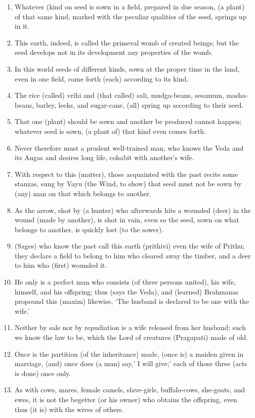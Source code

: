 \begin{enumerate}
\item Whatever (kind on seed is sown in a field, prepared in due season, (a plant) of that same kind, marked with the peculiar qualities of the seed, springs up in it.
\item This earth, indeed, is called the primeval womb of created beings; but the seed develops not in its development any properties of the womb.
\item In this world seeds of different kinds, sown at the proper time in the land, even in one field, come forth (each) according to its kind.
\item The rice (called) vrihi and (that called) sali, mudga-beans, sesamum, masha-beans, barley, leeks, and sugar-cane, (all) spring up according to their seed.
\item That one (plant) should be sown and another be produced cannot happen; whatever seed is sown, (a plant of) that kind even comes forth.
\item Never therefore must a prudent well-trained man, who knows the Veda and its Angas and desires long life, cohabit with another's wife.
\item With respect to this (matter), those acquainted with the past recite some stanzas, sung by Vayu (the Wind, to show) that seed must not be sown by (any) man on that which belongs to another.
\item As the arrow, shot by (a hunter) who afterwards hits a wounded (deer) in the wound (made by another), is shot in vain, even so the seed, sown on what belongs to another, is quickly lost (to the sower).
\item (Sages) who know the past call this earth (prithivi) even the wife of Prithu; they declare a field to belong to him who cleared away the timber, and a deer to him who (first) wounded it.
\item He only is a perfect man who consists (of three persons united), his wife, himself, and his offspring; thus (says the Veda), and (learned) Brahmanas propound this (maxim) likewise, `The husband is declared to be one with the wife.'
\item Neither by sale nor by repudiation is a wife released from her husband; such we know the law to be, which the Lord of creatures (Pragapati) made of old.
\item Once is the partition (of the inheritance) made, (once is) a maiden given in marriage, (and) once does (a man) say,' I will give;' each of those three (acts is done) once only.
\item As with cows, mares, female camels, slave-girls, buffalo-cows, she-goats, and ewes, it is not the begetter (or his owner) who obtains the offspring, even thus (it is) with the wives of others.

\end{enumerate}
